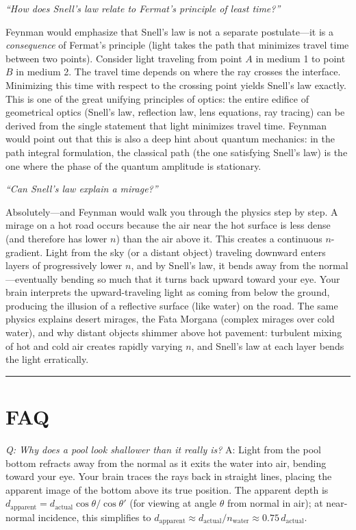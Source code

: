 \documentclass[11pt,openright]{book}
\begin{document}
\textit{``How does Snell's law relate to Fermat's principle of least time?''}

Feynman would emphasize that Snell's law is not a separate postulate---it is a \emph{consequence} of Fermat's principle (light takes the path that minimizes travel time between two points). Consider light traveling from point $A$ in medium 1 to point $B$ in medium 2. The travel time depends on where the ray crosses the interface. Minimizing this time with respect to the crossing point yields Snell's law exactly. This is one of the great unifying principles of optics: the entire edifice of geometrical optics (Snell's law, reflection law, lens equations, ray tracing) can be derived from the single statement that light minimizes travel time. Feynman would point out that this is also a deep hint about quantum mechanics: in the path integral formulation, the classical path (the one satisfying Snell's law) is the one where the phase of the quantum amplitude is stationary.

\textit{``Can Snell's law explain a mirage?''}

Absolutely---and Feynman would walk you through the physics step by step. A mirage on a hot road occurs because the air near the hot surface is less dense (and therefore has lower $n$) than the air above it. This creates a continuous $n$-gradient. Light from the sky (or a distant object) traveling downward enters layers of progressively lower $n$, and by Snell's law, it bends away from the normal---eventually bending so much that it turns back upward toward your eye. Your brain interprets the upward-traveling light as coming from below the ground, producing the illusion of a reflective surface (like water) on the road. The same physics explains desert mirages, the Fata Morgana (complex mirages over cold water), and why distant objects shimmer above hot pavement: turbulent mixing of hot and cold air creates rapidly varying $n$, and Snell's law at each layer bends the light erratically.

\bigskip
\hrule
\bigskip
\section*{FAQ}

\textit{Q: Why does a pool look shallower than it really is?}
A: Light from the pool bottom refracts away from the normal as it exits the water into air, bending toward your eye. Your brain traces the rays back in straight lines, placing the apparent image of the bottom above its true position. The apparent depth is $d_{\text{apparent}} = d_{\text{actual}}\cos\theta/\cos\theta'$ (for viewing at angle $\theta$ from normal in air); at near-normal incidence, this simplifies to $d_{\text{apparent}} \approx d_{\text{actual}}/n_{\text{water}} \approx 0.75\,d_{\text{actual}}$.
\end{document}
